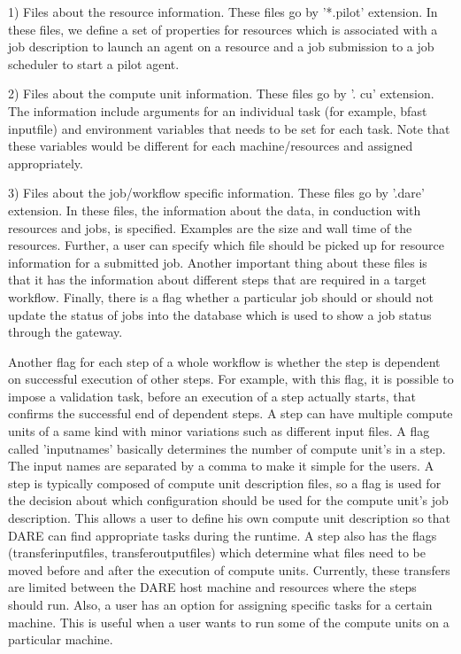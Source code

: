 \documentclass[]{svjour3}
\begin{document}
1) Files about the resource information. These files go by '*.pilot' extension. In these files, we define a set of properties for resources which is associated with a job description to launch an agent on a resource and a job submission to a job scheduler to start a pilot agent. 

2) Files about the compute unit information.  These files go by '. cu'  extension.  The information include arguments for an individual task (for example, bfast input\textunderscore file) and environment variables that needs to be set for each task. Note that these variables would be different for each machine/resources and assigned appropriately.

3) Files about the job/workflow specific information.  These files go by '.dare' extension. In these files, the information about the data, in conduction with resources and jobs, is specified. Examples are the size and wall time of the resources.  Further, a user can specify which file should be picked up for resource information for a submitted job.  Another important thing about these files is that it has the information about different steps that are required in a target workflow.  Finally, there is a flag whether a particular job should or should not update the status of jobs into the database which is used to show a job status through the gateway.  

Another flag for each step of a whole workflow is whether the step is dependent on successful execution of other steps.  For example, with this flag, it is possible to impose a validation task, before an execution of a step actually starts, that confirms the successful end of dependent steps.  A step can have multiple compute units of a same kind with minor variations such as different input files.  A flag called 'input\textunderscore names' basically determines the number of compute unit's in a step. The input names are separated by a comma to make it simple for the users. A step is typically composed of compute unit description files, so a flag is used for the decision about which configuration should be used for the compute unit's job description.  This allows a user to define his own compute unit description so that DARE can find appropriate tasks during the runtime. A step also has the flags (transfer\textunderscore input\textunderscore files, transfer\textunderscore output\textunderscore files) which determine what files need to be moved before and after the execution of compute units. Currently, these transfers are limited between the DARE host machine and resources where the steps should run.  Also, a user has an option for assigning specific tasks for a certain machine.  This is useful when a user wants to run some of the compute units on a particular machine. 
\end{document}
